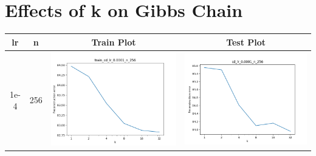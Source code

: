 \documentclass[12pt]{report}
\begin{document}
\section{Effects of k on Gibbs Chain}
\begin{table}[H]
  \centering
  \begin{tabular}{ | c | c | c | c |}
    \hline
    \textbf{lr} & \textbf{n} & \textbf{Train Plot} & \textbf{Test Plot} \\ \hline
    1e-4 & 256 &
    \begin{minipage}{.3\textwidth}
      \includegraphics[scale=0.25]{train_cd_lr_0_0001_n_256.png}
    \end{minipage} &
    \begin{minipage}{.3\textwidth}
      \includegraphics[scale=0.25]{cd_lr_0_0001_n_256.png}

\end{minipage}
\end{tabular}
\end{table}
\end{document}

